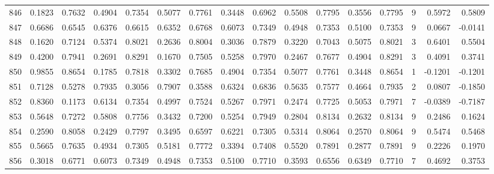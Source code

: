 \begin{tabular}{lrrrrrrrrrrrrrrr}
846 &      0.1823 &  0.7632 &  0.4904 &  0.7354 &  0.5077 &  0.7761 &  0.3448 &  0.6962 &  0.5508 &  0.7795 &   0.3556 &     0.7795 &      9 &                    0.5972 &                     0.5809 \\
847 &      0.6686 &  0.6545 &  0.6376 &  0.6615 &  0.6352 &  0.6768 &  0.6073 &  0.7349 &  0.4948 &  0.7353 &   0.5100 &     0.7353 &      9 &                    0.0667 &                    -0.0141 \\
848 &      0.1620 &  0.7124 &  0.5374 &  0.8021 &  0.2636 &  0.8004 &  0.3036 &  0.7879 &  0.3220 &  0.7043 &   0.5075 &     0.8021 &      3 &                    0.6401 &                     0.5504 \\
849 &      0.4200 &  0.7941 &  0.2691 &  0.8291 &  0.1670 &  0.7505 &  0.5258 &  0.7970 &  0.2467 &  0.7677 &   0.4904 &     0.8291 &      3 &                    0.4091 &                     0.3741 \\
850 &      0.9855 &  0.8654 &  0.1785 &  0.7818 &  0.3302 &  0.7685 &  0.4904 &  0.7354 &  0.5077 &  0.7761 &   0.3448 &     0.8654 &      1 &                   -0.1201 &                    -0.1201 \\
851 &      0.7128 &  0.5278 &  0.7935 &  0.3056 &  0.7907 &  0.3588 &  0.6324 &  0.6836 &  0.5635 &  0.7577 &   0.4664 &     0.7935 &      2 &                    0.0807 &                    -0.1850 \\
852 &      0.8360 &  0.1173 &  0.6134 &  0.7354 &  0.4997 &  0.7524 &  0.5267 &  0.7971 &  0.2474 &  0.7725 &   0.5053 &     0.7971 &      7 &                   -0.0389 &                    -0.7187 \\
853 &      0.5648 &  0.7272 &  0.5808 &  0.7756 &  0.3432 &  0.7200 &  0.5254 &  0.7949 &  0.2804 &  0.8134 &   0.2632 &     0.8134 &      9 &                    0.2486 &                     0.1624 \\
854 &      0.2590 &  0.8058 &  0.2429 &  0.7797 &  0.3495 &  0.6597 &  0.6221 &  0.7305 &  0.5314 &  0.8064 &   0.2570 &     0.8064 &      9 &                    0.5474 &                     0.5468 \\
855 &      0.5665 &  0.7635 &  0.4934 &  0.7305 &  0.5181 &  0.7772 &  0.3394 &  0.7408 &  0.5520 &  0.7891 &   0.2877 &     0.7891 &      9 &                    0.2226 &                     0.1970 \\
856 &      0.3018 &  0.6771 &  0.6073 &  0.7349 &  0.4948 &  0.7353 &  0.5100 &  0.7710 &  0.3593 &  0.6556 &   0.6349 &     0.7710 &      7 &                    0.4692 &                     0.3753 \\

\end{tabular}
